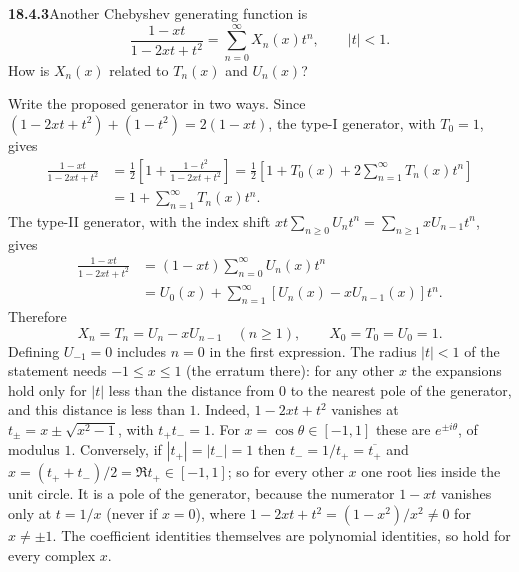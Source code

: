 \par\bigskip
\noindent\textbf{18.4.3}\quad Another Chebyshev generating function is
\[
\frac{1-xt}{1-2xt+t^{2}}=\sum_{n=0}^{\infty}X_{n}(x)t^{n},
\qquad |t| < 1.
\]
How is $X_{n}(x)$ related to $T_{n}(x)$ and $U_{n}(x)$?
\par\nobreak
\solution
Write the proposed generator in two ways.  Since
$(1-2xt+t^2)+(1-t^2)=2(1-xt)$, the type-I generator, with $T_0=1$,
gives
\begin{align*}
\frac{1-xt}{1-2xt+t^2}
 &=\frac12\left[1+\frac{1-t^2}{1-2xt+t^2}\right]
 =\frac12\left[1+T_0(x)+2\sum_{n=1}^\infty T_n(x)t^n\right]\\
 &=1+\sum_{n=1}^\infty T_n(x)t^n.
\end{align*}
The type-II generator, with the index shift
$xt\sum_{n\ge0}U_nt^n=\sum_{n\ge1}xU_{n-1}t^n$, gives
\begin{align*}
\frac{1-xt}{1-2xt+t^2}
 &=(1-xt)\sum_{n=0}^\infty U_n(x)t^n\\
 &=U_0(x)+\sum_{n=1}^\infty[U_n(x)-xU_{n-1}(x)]t^n.
\end{align*}
Therefore
\[
\boxed{X_n=T_n=U_n-xU_{n-1}\quad(n\ge1),\qquad X_0=T_0=U_0=1}.
\]
Defining $U_{-1}=0$ includes $n=0$ in the first expression.
The radius $|t|<1$ of the statement needs $-1\le x\le1$ (the erratum
there): for any other $x$ the expansions hold only for $|t|$ less than
the distance from $0$ to the nearest pole of the generator, and this
distance is less than $1$.
Indeed, $1-2xt+t^2$ vanishes at $t_\pm=x\pm\sqrt{x^2-1}$, with
$t_+t_-=1$.  For $x=\cos\theta\in[-1,1]$ these are $e^{\pm i\theta}$,
of modulus $1$.  Conversely, if $|t_+|=|t_-|=1$ then
$t_-=1/t_+=\overline{t_+}$ and $x=(t_++t_-)/2=\Re t_+\in[-1,1]$; so
for every other $x$ one root lies inside the unit circle.  It is a
pole of the generator, because the numerator $1-xt$ vanishes only at
$t=1/x$ (never if $x=0$), where $1-2xt+t^2=(1-x^2)/x^2\ne0$ for
${x\ne\pm1}$.
The coefficient identities themselves are polynomial identities,
so hold for every complex $x$.

